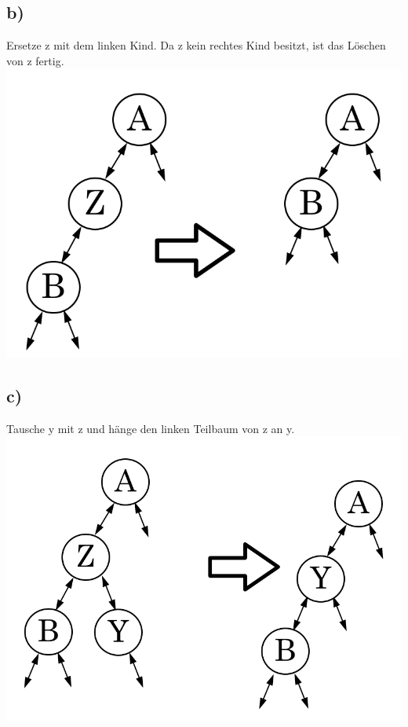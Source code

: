 \documentclass[a4paper,11pt,twoside]{article}
\begin{document}
\subsection*{b)}Ersetze z mit dem linken Kind. Da z kein rechtes Kind besitzt, ist das Löschen von z fertig.\\
\includegraphics*[scale=0.2]{Images/B.png}
\subsection*{c)} Tausche y mit z und hänge den linken Teilbaum von z an y. \\
\includegraphics*[scale=0.2]{Images/C.png}
\end{document}
